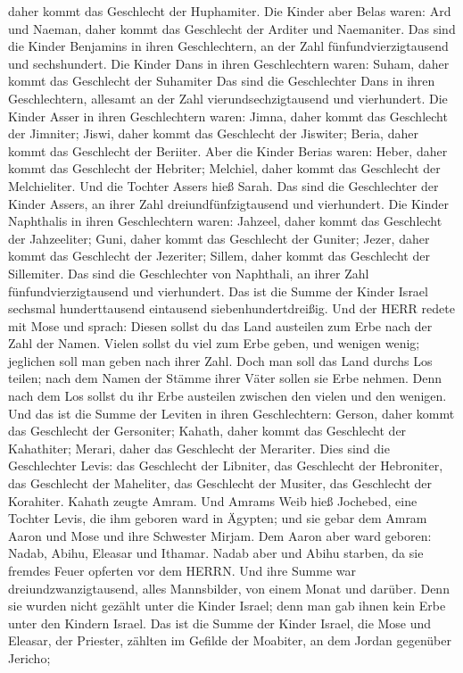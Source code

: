 daher kommt das Geschlecht der Huphamiter.  Die Kinder aber
Belas waren: Ard und Naeman, daher kommt das Geschlecht der Arditer und
Naemaniter.  Das sind die Kinder Benjamins in ihren
Geschlechtern, an der Zahl fünfundvierzigtausend und sechshundert.
 Die Kinder Dans in ihren Geschlechtern waren: Suham, daher
kommt das Geschlecht der Suhamiter  Das sind die
Geschlechter Dans in ihren Geschlechtern, allesamt an der Zahl
vierundsechzigtausend und vierhundert.  Die Kinder Asser in
ihren Geschlechtern waren: Jimna, daher kommt das Geschlecht der
Jimniter; Jiswi, daher kommt das Geschlecht der Jiswiter; Beria, daher
kommt das Geschlecht der Beriiter.  Aber die Kinder Berias
waren: Heber, daher kommt das Geschlecht der Hebriter; Melchiel, daher
kommt das Geschlecht der Melchieliter.  Und die Tochter
Assers hieß Sarah.  Das sind die Geschlechter der Kinder
Assers, an ihrer Zahl dreiundfünfzigtausend und vierhundert.
 Die Kinder Naphthalis in ihren Geschlechtern waren:
Jahzeel, daher kommt das Geschlecht der Jahzeeliter; Guni, daher kommt
das Geschlecht der Guniter;  Jezer, daher kommt das
Geschlecht der Jezeriter; Sillem, daher kommt das Geschlecht der
Sillemiter.  Das sind die Geschlechter von Naphthali, an
ihrer Zahl fünfundvierzigtausend und vierhundert.  Das ist
die Summe der Kinder Israel sechsmal hunderttausend eintausend
siebenhundertdreißig.  Und der HERR redete mit Mose und
sprach:  Diesen sollst du das Land austeilen zum Erbe nach
der Zahl der Namen.  Vielen sollst du viel zum Erbe geben,
und wenigen wenig; jeglichen soll man geben nach ihrer Zahl.
 Doch man soll das Land durchs Los teilen; nach dem Namen
der Stämme ihrer Väter sollen sie Erbe nehmen.  Denn nach
dem Los sollst du ihr Erbe austeilen zwischen den vielen und den
wenigen.  Und das ist die Summe der Leviten in ihren
Geschlechtern: Gerson, daher kommt das Geschlecht der Gersoniter;
Kahath, daher kommt das Geschlecht der Kahathiter; Merari, daher das
Geschlecht der Merariter.  Dies sind die Geschlechter
Levis: das Geschlecht der Libniter, das Geschlecht der Hebroniter, das
Geschlecht der Maheliter, das Geschlecht der Musiter, das Geschlecht der
Korahiter. Kahath zeugte Amram.  Und Amrams Weib hieß
Jochebed, eine Tochter Levis, die ihm geboren ward in Ägypten; und sie
gebar dem Amram Aaron und Mose und ihre Schwester Mirjam. 
Dem Aaron aber ward geboren: Nadab, Abihu, Eleasar und Ithamar.
 Nadab aber und Abihu starben, da sie fremdes Feuer
opferten vor dem HERRN.  Und ihre Summe war
dreiundzwanzigtausend, alles Mannsbilder, von einem Monat und darüber.
Denn sie wurden nicht gezählt unter die Kinder Israel; denn man gab
ihnen kein Erbe unter den Kindern Israel.  Das ist die
Summe der Kinder Israel, die Mose und Eleasar, der Priester, zählten im
Gefilde der Moabiter, an dem Jordan gegenüber Jericho;

